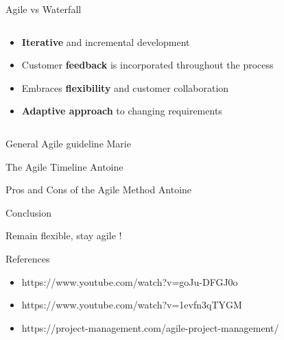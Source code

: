 \documentclass[10pt]{beamer}
\begin{document}
\begin{frame}{Agile vs Waterfall}
  \vspace{2cm}
  \begin{columns}[T]
    \begin{column}{0.5\textwidth}
      \begin{itemize}
        \item<2-> \textbf{Iterative} and incremental development 
        \item<3-> Customer \textbf{feedback} is incorporated throughout the process
        \item<4-> Embraces \textbf{flexibility} and customer collaboration
        \item<5-> \textbf{Adaptive approach }to changing requirements
      \end{itemize}
    \end{column}

    \begin{column}{0.5\textwidth}
    \end{column}
  \end{columns}
\end{frame}

\begin{frame}{General Agile guideline}
    Marie
\end{frame}

\begin{frame}{The Agile Timeline}
    Antoine
\end{frame}

\begin{frame}{Pros and Cons of the Agile Method}
    Antoine
\end{frame}

\begin{frame}{Conclusion}

  Remain flexible, stay agile !
  
\end{frame}

\begin{frame}{References}
  \begin{itemize}
    \item https://www.youtube.com/watch?v=goJu-DFGJ0o
    \item https://www.youtube.com/watch?v=1evfn3qTYGM
    \item https://project-management.com/agile-project-management/
  \end{itemize}
\end{frame}
\end{document}
